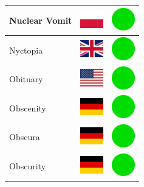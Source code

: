 \documentclass[12pt, a4paper, twoside]{report}
\begin{document}
\begin{center}
\begin{longtable}{|p{5cm}|p{2cm}|p{2cm}|}
 Nuclear Vomit                                              & \includegraphics[width=1cm]{../img/flags/pl} &   \includegraphics[width=1cm]{../likes/y} \\ \hline
 Nyctopia                                                   & \includegraphics[width=1cm]{../img/flags/gb} &   \includegraphics[width=1cm]{../likes/y} \\ \hline
 Obituary                                                   & \includegraphics[width=1cm]{../img/flags/us} &   \includegraphics[width=1cm]{../likes/y} \\ \hline
 Obscenity                                                  & \includegraphics[width=1cm]{../img/flags/de} &   \includegraphics[width=1cm]{../likes/y} \\ \hline
 Obscura                                                    & \includegraphics[width=1cm]{../img/flags/de} &   \includegraphics[width=1cm]{../likes/y} \\ \hline
 Obscurity                                                  & \includegraphics[width=1cm]{../img/flags/de} &   \includegraphics[width=1cm]{../likes/y} \\ \hline

\end{longtable}
\end{center}
\end{document}
